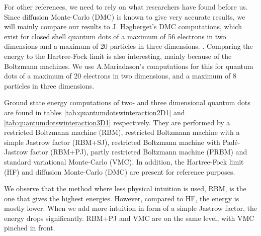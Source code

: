 For other references, we need to rely on what researchers have found before us. Since diffusion Monte-Carlo (DMC) is known to give very accurate results, we will mainly compare our results to J. Høgberget's DMC computations, which exist for closed shell quantum dots of a maximum of 56 electrons in two dimensions and a maximum of 20 particles in three dimensions. \cite{hogberget_quantum_2013}. Comparing the energy to the Hartree-Fock limit is also interesting, mainly because of the Boltzmann machines. We use A.Mariadason's computations for this for quantum dots of a maximum of 20 electrons in two dimensions, and a maximum of 8 particles in three dimensions. \cite{mariadason_quantum_2018}

Ground state energy computations of two- and three dimensional quantum dots are found in tables \eqref{tab:quantumdotswinteraction2D1} and \eqref{tab:quantumdotswinteraction3D1} respectively. They are performed by a restricted Boltzmann machine (RBM), restricted Boltzmann machine with a simple Jastrow factor (RBM+SJ), restricted Boltzmann machine with Padé-Jastrow factor (RBM+PJ), partly restricted Boltzmann machine (PRBM) and standard variational Monte-Carlo (VMC). In addition, the Hartree-Fock limit (HF) and diffusion Monte-Carlo (DMC) are present for reference purposes. 

We observe that the method where less physical intuition is used, RBM, is the one that gives the highest energies. However, compared to HF, the energy is mostly lower. When we add more intuition in form of a simple Jastrow factor, the energy drops significantly. RBM+PJ and VMC are on the same level, with VMC pinched in front.

